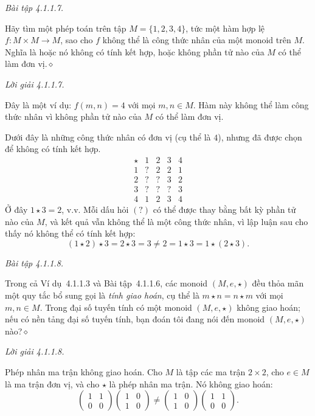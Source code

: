\noindent\textit{Bài tập 4.1.1.7.}\keepwithnext

Hãy tìm một phép toán trên tập $M=\{1,2,3,4\}$, tức một hàm hợp lệ $f:M\times M\to M$, sao cho $f$ không thể là công thức nhân của một monoid trên $M$. Nghĩa là hoặc nó không có tính kết hợp, hoặc không phần tử nào của $M$ có thể làm đơn vị.\hfill$\diamond$

\noindent\textit{Lời giải 4.1.1.7.}\keepwithnext

Đây là một ví dụ: $f(m,n)=4$ với mọi $m,n\in M$. Hàm này không thể làm công thức nhân vì không phần tử nào của $M$ có thể làm đơn vị.

Dưới đây là những công thức nhân có đơn vị (cụ thể là $4$), nhưng đã được chọn để không có tính kết hợp.
\[
\begin{array}{c|cccc}
\star&1&2&3&4\\\hline
1&?&2&2&1\\
2&?&?&3&2\\
3&?&?&?&3\\
4&1&2&3&4
\end{array}
\]
Ở đây $1\star3=2$, v.v. Mỗi dấu hỏi $(?)$ có thể được thay bằng bất kỳ phần tử nào của $M$, và kết quả vẫn không thể là một công thức nhân, vì lập luận sau cho thấy nó không thể có tính kết hợp:
\[
(1\star2)\star3=2\star3=3\ne2=1\star3=1\star(2\star3).
\tag*{$\blacklozenge$}
\]

\noindent\textit{Bài tập 4.1.1.8.}\keepwithnext

Trong cả Ví dụ~4.1.1.3 và Bài tập~4.1.1.6, các monoid $(M,e,\star)$ đều thỏa mãn một quy tắc bổ sung gọi là \emph{tính giao hoán}, cụ thể là $m\star n=n\star m$ với mọi $m,n\in M$. Trong đại số tuyến tính có một monoid $(M,e,\star)$ không giao hoán; nếu có nền tảng đại số tuyến tính, bạn đoán tôi đang nói đến monoid $(M,e,\star)$ nào?\hfill$\diamond$

\noindent\textit{Lời giải 4.1.1.8.}\keepwithnext

Phép nhân ma trận không giao hoán. Cho $M$ là tập các ma trận $2\times2$, cho $e\in M$ là ma trận đơn vị, và cho $\star$ là phép nhân ma trận. Nó không giao hoán:
\[
\begin{pmatrix}1&1\\0&0\end{pmatrix}
\begin{pmatrix}1&0\\1&0\end{pmatrix}
\ne
\begin{pmatrix}1&0\\1&0\end{pmatrix}
\begin{pmatrix}1&1\\0&0\end{pmatrix}.
\tag*{$\blacklozenge$}
\]

